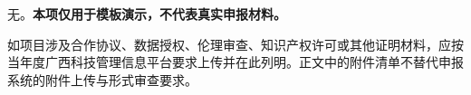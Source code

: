 \GXNSFBodyText

无。\textbf{本项仅用于模板演示，不代表真实申报材料。}

如项目涉及合作协议、数据授权、伦理审查、知识产权许可或其他证明材料，应按当年度广西科技管理信息平台要求上传并在此列明。正文中的附件清单不替代申报系统的附件上传与形式审查要求。
